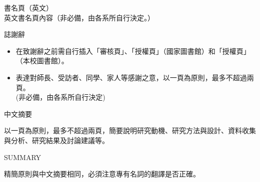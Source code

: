 \documentclass[12pt,oneside,openany,a4paper]{book}
\begin{document}
\pagestyle{plain}
\parindent=0.8cm
% 

\newpage
\thispagestyle{empty}


\newpage
\thispagestyle{empty}
\begin{center}
\end{center}

\newpage
\thispagestyle{empty}


\newpage
\thispagestyle{empty}
\noindent 書名頁（英文）\\
英文書名頁內容（非必備，由各系所自行決定。）

\newpage
\thispagestyle{empty}
\begin{center}
    {\LARGE{誌謝辭}}
\end{center}
\begin{itemize}
    \item 在致謝辭之前需自行插入「審核頁」、「授權頁」（國家圖書館）和「授權頁」（本校圖書館）。
    \item 表達對師長、受訪者、同學、家人等感謝之意，以一頁為原則，最多不超過兩頁。\\
        (非必備，由各系所自行決定)
\end{itemize}

\frontmatter
\begin{center}
    {\LARGE{中文摘要}}
\end{center}
以一頁為原則，最多不超過兩頁，簡要說明研究動機、研究方法與設計、資料收集與分析、研究結果及討論建議等。

\newpage
\begin{center}
    {\LARGE SUMMARY}
\end{center}
精簡原則與中文摘要相同，必須注意專有名詞的翻譯是否正確。
\end{document}
